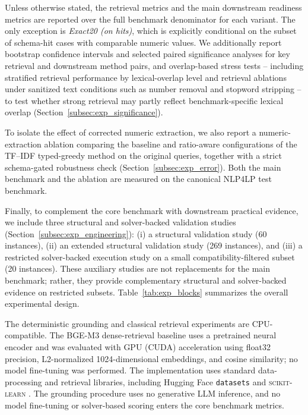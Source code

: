 \documentclass[3p]{elsarticle}
\begin{document}
Unless otherwise stated, the retrieval metrics and the main downstream readiness metrics are reported over the full benchmark denominator for each variant. The only exception is \textit{Exact20 (on hits)}, which is explicitly conditional on the subset of schema-hit cases with comparable numeric values. We additionally report bootstrap confidence intervals and selected paired significance analyses for key retrieval and downstream method pairs, and overlap-based stress tests -- including stratified retrieval performance by lexical-overlap level and retrieval ablations under sanitized text conditions such as number removal and stopword stripping -- to test whether strong retrieval may partly reflect benchmark-specific lexical overlap (Section~\ref{subsec:exp_significance}).

To isolate the effect of corrected numeric extraction, we also report a numeric-extraction ablation comparing the baseline and ratio-aware configurations of the TF--IDF typed-greedy method on the original queries, together with a strict schema-gated robustness check (Section~\ref{subsec:exp_error}). Both the main benchmark and the ablation are measured on the canonical \textsc{NLP4LP} test benchmark.

Finally, to complement the core benchmark with downstream practical evidence, we include three structural and solver-backed validation studies (Section~\ref{subsec:exp_engineering}): (i) a structural validation study (60 instances), (ii) an extended structural validation study (269 instances), and (iii) a restricted solver-backed execution study on a small compatibility-filtered subset (20 instances). These auxiliary studies are not replacements for the main benchmark; rather, they provide complementary structural and solver-backed evidence on restricted subsets. Table~\ref{tab:exp_blocks} summarizes the overall experimental design.

The deterministic grounding and classical retrieval experiments are CPU-compatible. The BGE-M3 dense-retrieval baseline uses a pretrained neural encoder and was evaluated with GPU (CUDA) acceleration using float32 precision, L2-normalized 1024-dimensional embeddings, and cosine similarity; no model fine-tuning was performed. The implementation uses standard data-processing and retrieval libraries, including Hugging Face \texttt{datasets} \cite{lhoest2021datasets} and \textsc{scikit-learn} \cite{pedregosa2011sklearn}. The grounding procedure uses no generative LLM inference, and no model fine-tuning or solver-based scoring enters the core benchmark metrics.
\end{document}
